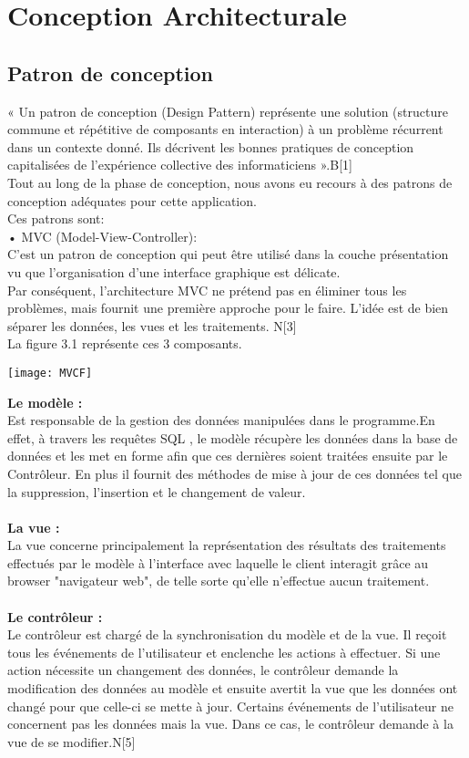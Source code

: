 \documentclass[a4paper,12pt,oneside]{report}
\begin{document}
   \section{Conception Architecturale }
   \subsection{Patron de conception}
   
« Un patron de conception (Design Pattern) représente une solution (structure commune et
répétitive de composants en interaction) à un problème récurrent dans un contexte donné. Ils décrivent les bonnes pratiques de conception capitalisées de l'expérience collective des informaticiens ».B[1] \\ 
Tout au long de la phase de conception, nous avons eu recours à des patrons de conception adéquates pour cette application. \\ Ces patrons sont:  \\
• MVC (Model-View-Controller):\\ 
C'est un patron de conception qui peut être utilisé dans la couche présentation vu que l'organisation d'une interface graphique est délicate. \\ Par conséquent, l'architecture MVC ne prétend pas en éliminer tous les problèmes, mais fournit une première approche pour le faire. L'idée est de bien séparer les données, les vues et les traitements. N[3] \\ 
La figure 3.1 représente ces 3 composants.
   \begin{center}
\texttt{[image: MVCF]}

\label{fig1}
\end{center}    
\textbf{Le modèle :}\\
Est responsable de la gestion des données manipulées dans le programme.En effet, à travers les requêtes SQL , le modèle récupère les données dans la base de données et les met en forme afin que ces dernières soient traitées ensuite par le Contrôleur.
En plus il fournit des méthodes de mise à jour de ces données tel que la suppression, l'insertion et le changement de valeur.\\
\\
\textbf{La vue :}\\
La vue concerne principalement la représentation des résultats des traitements effectués par le modèle à l'interface avec laquelle le client interagit grâce au browser "navigateur web", de telle sorte qu'elle n'effectue aucun traitement. \\
\\
\textbf{Le contrôleur :}\\
Le contrôleur est chargé de la synchronisation du modèle et de la vue. Il reçoit tous les événements de l'utilisateur et enclenche les actions à effectuer. Si une action nécessite un changement des données, le contrôleur demande la modification des données au modèle et ensuite avertit la vue que les données ont changé pour que celle-ci se mette à jour. Certains événements de l'utilisateur ne concernent pas les données mais la vue. Dans ce cas, le contrôleur demande à la vue de se modifier.N[5]
\end{document}
